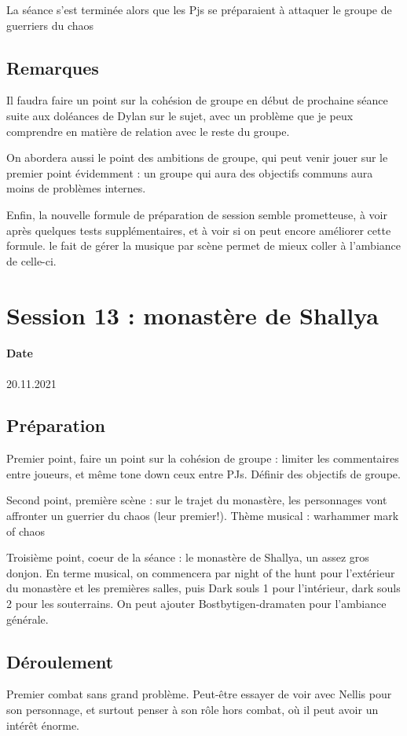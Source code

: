 \documentclass[10pt,a4paper]{book}
\begin{document}
La séance s'est terminée alors que les Pjs se préparaient à attaquer le groupe de guerriers du chaos 
\subsection{Remarques}
Il faudra faire un point sur la cohésion de groupe en début de prochaine séance suite aux doléances de Dylan sur le sujet, avec un problème que je peux comprendre en matière de relation avec le reste du groupe.

On abordera aussi le point des ambitions de groupe, qui peut venir jouer sur le premier point évidemment : un groupe qui aura des objectifs communs aura moins de problèmes internes.

Enfin, la nouvelle formule de préparation de session semble prometteuse, à voir après quelques tests supplémentaires, et à voir si on peut encore améliorer cette formule. le fait de gérer la musique par scène permet de mieux coller à l'ambiance de celle-ci.
\section{Session 13 : monastère de Shallya}
\paragraph{Date} 20.11.2021
\subsection{Préparation}
Premier point, faire un point sur la cohésion de groupe : limiter les commentaires entre joueurs, et même tone down ceux entre PJs. Définir des objectifs de groupe.

Second point, première scène : sur le trajet du monastère, les personnages vont affronter un guerrier du chaos (leur premier!). Thème musical : warhammer mark of chaos

Troisième point, coeur de la séance : le monastère de Shallya, un assez gros donjon. En terme musical, on commencera par night of the hunt pour l'extérieur du monastère et les premières salles, puis Dark souls 1 pour l'intérieur, dark souls 2 pour les souterrains. On peut ajouter Bostbytigen-dramaten pour l'ambiance générale.
\subsection{Déroulement}
Premier combat sans grand problème. Peut-être essayer de voir avec Nellis pour son personnage, et surtout penser à son rôle hors combat, où il peut avoir un intérêt énorme.
\end{document}
